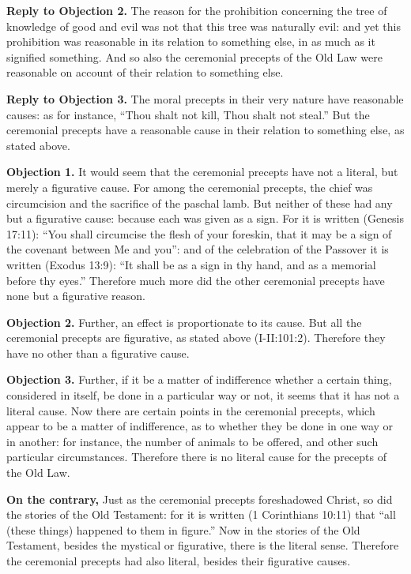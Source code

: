 \textbf{Reply to Objection 2.} The reason for the prohibition concerning the tree of knowledge of good and evil was not that this tree was naturally evil: and yet this prohibition was reasonable in its relation to something else, in as much as it signified something. And so also the ceremonial precepts of the Old Law were reasonable on account of their relation to something else.

\textbf{Reply to Objection 3.} The moral precepts in their very nature have reasonable causes: as for instance, ``Thou shalt not kill, Thou shalt not steal.'' But the ceremonial precepts have a reasonable cause in their relation to something else, as stated above.


\textbf{Objection 1.} It would seem that the ceremonial precepts have not a literal, but merely a figurative cause. For among the ceremonial precepts, the chief was circumcision and the sacrifice of the paschal lamb. But neither of these had any but a figurative cause: because each was given as a sign. For it is written (Genesis 17:11): ``You shall circumcise the flesh of your foreskin, that it may be a sign of the covenant between Me and you'': and of the celebration of the Passover it is written (Exodus 13:9): ``It shall be as a sign in thy hand, and as a memorial before thy eyes.'' Therefore much more did the other ceremonial precepts have none but a figurative reason.

\textbf{Objection 2.} Further, an effect is proportionate to its cause. But all the ceremonial precepts are figurative, as stated above (I-II:101:2). Therefore they have no other than a figurative cause.

\textbf{Objection 3.} Further, if it be a matter of indifference whether a certain thing, considered in itself, be done in a particular way or not, it seems that it has not a literal cause. Now there are certain points in the ceremonial precepts, which appear to be a matter of indifference, as to whether they be done in one way or in another: for instance, the number of animals to be offered, and other such particular circumstances. Therefore there is no literal cause for the precepts of the Old Law.

\textbf{On the contrary,} Just as the ceremonial precepts foreshadowed Christ, so did the stories of the Old Testament: for it is written (1 Corinthians 10:11) that ``all (these things) happened to them in figure.'' Now in the stories of the Old Testament, besides the mystical or figurative, there is the literal sense. Therefore the ceremonial precepts had also literal, besides their figurative causes.

